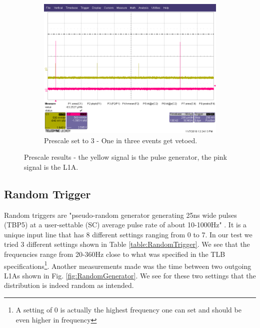 \begin{figure}
    \begin{subfigure}[t]{.5\textwidth}
      \includegraphics[width=1.0\linewidth]{2kHzPrescale3.png}
      \caption{Prescale set to 3 - One in three events get vetoed.}
      \label{fig:2kHzPrescale3}
    \end{subfigure}
    \caption[Prescale results]{Prescale results - the yellow signal is the pulse generator, the pink signal is the L1A.}
    \label{fig:Prescales}
\end{figure}


\subsection{Random Trigger}
\label{Random Trigger}

Random triggers are "pseudo-random generator generating 25ns wide pulses (TBP5) at a user-settable (SC) average pulse rate of about 10-1000Hz" \cite{debieux_trigger_2019}. It is a unique input line that has 8 different settings ranging from 0 to 7. In our test we tried 3 different settings shown in Table \ref{table:RandomTrigger}. We see that the frequencies range from 20-360Hz close to what was specified in the TLB specifications\footnote{A setting of 0 is actually the highest frequency one can set and should be even higher in frequency}. Another measurements made was the time between two outgoing L1As shown in Fig. \ref{fig:RandomGenerator}. We see for these two settings that the distribution is indeed random as intended.

